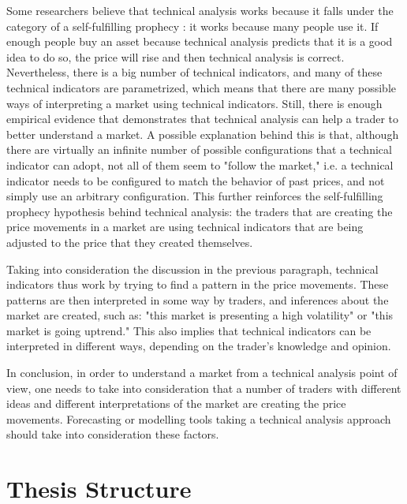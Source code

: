 Some researchers believe that technical analysis works because it falls under
the category of a self-fulfilling prophecy \cite{salganik2008leading}: it works
because many people use it. If enough people buy an asset because technical
analysis predicts that it is a good idea to do so, the price will rise and then
technical analysis is correct. Nevertheless, there is a big number of technical
indicators, and many of these technical indicators are parametrized, which means
that there are many possible ways of interpreting a market using technical
indicators. Still, there is enough empirical evidence that demonstrates that
technical analysis can help a trader to better understand a market. A possible
explanation behind this is that, although there are virtually an infinite number
of possible configurations that a technical indicator can adopt, not all of them
seem to "follow the market," i.e. a technical indicator needs to be configured
to match the behavior of past prices, and not simply use an arbitrary
configuration. This further reinforces the self-fulfilling prophecy hypothesis
behind technical analysis: the traders that are creating the price movements in
a market are using technical indicators that are being adjusted to the price
that they created themselves.

Taking into consideration the discussion in the previous paragraph, technical
indicators thus work by trying to find a pattern in the price movements. These
patterns are then interpreted in some way by traders, and inferences about the
market are created, such as: "this market is presenting a high volatility" or
"this market is going uptrend." This also implies that technical indicators can
be interpreted in different ways, depending on the trader's knowledge and
opinion.

In conclusion, in order to understand a market from a technical analysis point
of view, one needs to take into consideration that a number of traders with
different ideas and different interpretations of the market are creating the
price movements. Forecasting or modelling tools taking a technical analysis
approach should take into consideration these factors.

\section{Thesis Structure}
\label{section:thesis-structure}


